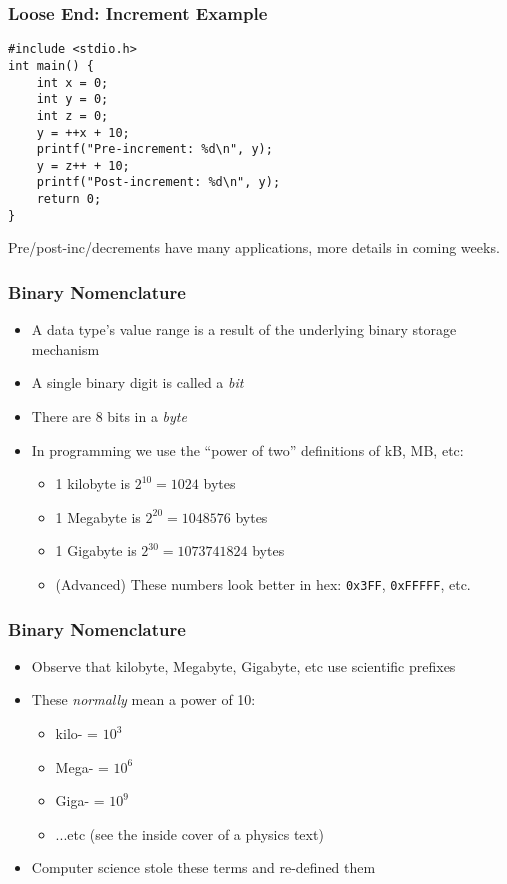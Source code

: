 \documentclass[14pt]{beamer}
\begin{document}
\begin{frame}[fragile]
\frametitle{Loose End: Increment Example}
\begin{lstlisting}[style=CStyle,caption=\texttt{increment.c}]
#include <stdio.h>
int main() {
	int x = 0;
	int y = 0;
	int z = 0;
	y = ++x + 10;
	printf("Pre-increment: %d\n", y);
	y = z++ + 10;
	printf("Post-increment: %d\n", y);
	return 0;
}
\end{lstlisting}
Pre/post-inc/decrements have many applications, more details in coming weeks.
\end{frame}

\begin{frame}
\frametitle{Binary Nomenclature}
\begin{itemize}
\item A data type's value range is a result of the underlying binary storage mechanism
\item A single binary digit is called a \textit{bit}
\item There are 8 bits in a \textit{byte}
\item In programming we use the ``power of two'' definitions of kB, MB, etc:
	\begin{itemize}
		\item 1 kilobyte is $2^{10} = 1024$ bytes
		\item 1 Megabyte is $2^{20} = 1048576$ bytes
		\item 1 Gigabyte is $2^{30} = 1073741824$ bytes
		\item (Advanced) These numbers look better in hex: \texttt{0x3FF}, \texttt{0xFFFFF}, etc.
	\end{itemize}
\end{itemize}
\end{frame}

\begin{frame}
\frametitle{Binary Nomenclature}
\begin{itemize}
\item Observe that kilobyte, Megabyte, Gigabyte, etc use scientific prefixes
\item These \textit{normally} mean a power of 10:
	\begin{itemize}
		\item kilo- = $10^3$
		\item Mega- = $10^6$
		\item Giga- = $10^9$
		\item ...etc (see the inside cover of a physics text)
	\end{itemize}
\item Computer science stole these terms and re-defined them

\end{itemize}
\end{frame}
\end{document}
